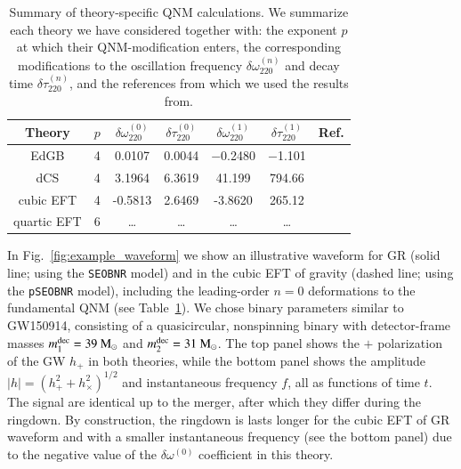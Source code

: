 \documentclass[twocolumn,
               prd,
               aps,
               superscriptaddress,
               tightenlines,
               nofootinbib,
               eqsecnum,
               amsfonts,
               amsmath,
               longbibliography]{revtex4-1}
\newcommand{\pSEOB}{\texttt{pSEOBNR}}
\newcommand{\msun}{~{\rm M}_{\odot}}
\begin{document}
\begin{table}[t]
\begin{tabular}{c | c c c c c c}
\hline
\hline
Theory & $p$ & $\delta \omega^{(0)}_{220}$ & $\delta \tau^{(0)}_{220}$ & $\delta \omega^{(1)}_{220}$ & $\delta \tau^{(1)}_{220}$ & Ref.  \\
\hline
EdGB        & 4 & 0.0107 & 0.0044 & $-$0.2480 & $-$1.101 &  \cite{Blazquez-Salcedo:2016enn,Pierini:2021jxd} \\
dCS         & 4 & 3.1964 & 6.3619 & 41.199 & 794.66 &  \cite{Wagle:2021tam}  \\
cubic EFT   & 4 & -0.5813  & 2.6469 & -3.8620 & 265.12 & \cite{Cano:2021myl} \\
quartic EFT & 6 & \dots  & \dots & \dots & \dots & \cite{Cano:2021myl}  \\
\hline
\hline
\end{tabular}
\caption{Summary of theory-specific QNM calculations.
%
We summarize each theory we have considered together with: the exponent $p$ at
which their QNM-modification enters, the corresponding modifications to the
oscillation frequency $\delta \omega^{(n)}_{220}$ and decay time $\delta \tau^{(n)}_{220}$, and the
references from which we used the results from.
}
\label{tab:ref_theories_qnms}
\end{table}

In Fig.~\ref{fig:example_waveform} we show an illustrative waveform for GR (solid line; using the \texttt{SEOBNR} model) and in the cubic EFT of gravity (dashed line; using the \pSEOB{} model),
including the leading-order $n = 0$ deformations to the fundamental QNM (see Table~\ref{tab:ref_theories_qnms}).
%
We chose binary parameters similar to GW150914, consisting of a quasicircular,
nonspinning binary with detector-frame masses
$m_1^{\rm dec} = 39\msun$ and $m_2^{\rm dec} = 31\msun$.
%
The top panel shows the $+$ polarization of the GW $h_{+}$ in both theories,
while the bottom panel shows the amplitude $|h| = (h_{+}^2 + h_{\times}^2)^{1/2}$
and instantaneous frequency $f$, all as functions of time $t$.
%
The signal are identical up to the merger, after which they differ during the ringdown.
%
By construction, the ringdown is lasts longer for the cubic EFT of GR waveform and
with a smaller instantaneous frequency (see the bottom panel) due to the negative value of the
$\delta\omega^{(0)}$ coefficient in this theory.
\end{document}
